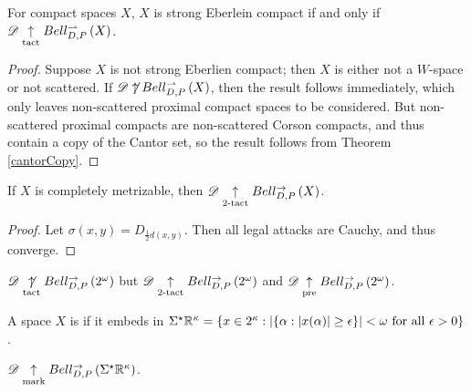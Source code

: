 \documentclass[11pt]{article}
\begin{document}
  \begin{corollary}
    For compact spaces $X$,
    $X$ is strong Eberlein compact if and only if
    $\mathscr{D}\underset{\text{tact}}{\uparrow}Bell_{D,P}^{\rightharpoonup}\left({X}\right)$.
  \end{corollary}

  \begin{proof}
    Suppose $X$ is not strong Eberlien compact; then $X$ is either
    not a $W$-space or not scattered.
    If $\mathscr{D}\not\uparrow Bell_{D,P}^{\rightharpoonup}\left({X}\right)$, then the result follows immediately,
    which only leaves non-scattered proximal compact spaces to be considered.
    But non-scattered proximal compacts are non-scattered Corson compacts,
    and thus contain
    a copy of the Cantor set, so the result follows from Theorem
    \ref{cantorCopy}.
  \end{proof}

  \begin{proposition}
    If \(X\) is completely metrizable,
    then \(\mathscr{D}\underset{2\text{-tact}}{\uparrow}Bell_{D,P}^{\to}\left({X}\right)\).
  \end{proposition}

  \begin{proof}
    Let \(\sigma(x,y)=D_{\frac{1}{2}d(x,y)}\). Then all legal attacks are
    Cauchy, and thus converge.
  \end{proof}

  \begin{corollary}
    \(\mathscr{D}\underset{\text{tact}}{\not\uparrow}Bell_{D,P}^{\to}\left({2^\omega}\right)\) but
    \(\mathscr{D}\underset{2\text{-tact}}{\uparrow}Bell_{D,P}^{\to}\left({2^\omega}\right)\) and
    \(\mathscr{D}\underset{\text{pre}}{\uparrow}Bell_{D,P}^{\to}\left({2^\omega}\right)\).
  \end{corollary}

  \newpage

  \begin{definition}
    A space $X$ is  if it embeds in
    $
      \Sigma^\star\mathbb{R}^{\kappa}
        =
      \{
        x\in2^\kappa
      :
        |\{\alpha:|x(\alpha)|\geq \epsilon\}|<\omega
        \text{ for all } \epsilon > 0
      \}
    $.
  \end{definition}

  \begin{theorem}
    $\mathscr{D}\underset{\text{mark}}{\uparrow}Bell_{D,P}^{\to}\left({\Sigma^\star\mathbb{R}^{\kappa}}\right)$.
  \end{theorem}
\end{document}
